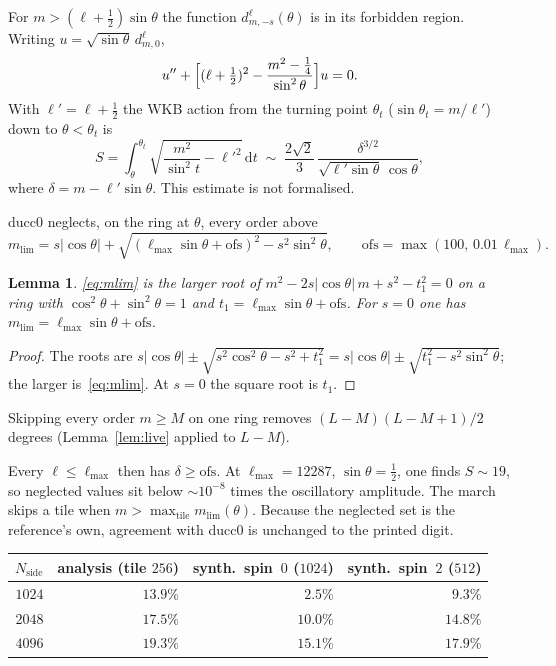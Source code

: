 \documentclass[11pt,a4paper]{article}
\newtheorem{lemma}[theorem]{Lemma}
\newcommand{\mlim}{m_{\mathrm{lim}}}
\newcommand{\ofs}{\mathrm{ofs}}
\numberwithin{equation}{section}
\begin{document}
For $m>(\ell+\tfrac12)\sin\theta$ the function $d^\ell_{m,-s}(\theta)$ is
in its forbidden region.  Writing $u=\sqrt{\sin\theta}\,d^\ell_{m,0}$,
\begin{equation}
\label{eq:legendre}
u''+\Bigl[(\ell+\tfrac12)^2-\frac{m^2-\tfrac14}{\sin^2\theta}\Bigr]u=0.
\end{equation}
With $\ell'=\ell+\tfrac12$ the WKB action from the turning point
$\theta_t$ ($\sin\theta_t=m/\ell'$) down to $\theta<\theta_t$ is
\begin{equation}
\label{eq:S}
S=\int_\theta^{\theta_t}
   \sqrt{\frac{m^2}{\sin^2 t}-{\ell'}^2}\,\mathrm{d}t
  \;\sim\;
  \frac{2\sqrt{2}}{3}\,
  \frac{\delta^{3/2}}{\sqrt{\ell'\sin\theta}\,\cos\theta},
\end{equation}
where $\delta=m-\ell'\sin\theta$.  This estimate is not formalised.

ducc0 neglects, on the ring at $\theta$, every order above
\begin{equation}
\label{eq:mlim}
\mlim
  =s\lvert\cos\theta\rvert
   +\sqrt{(\ell_{\max}\sin\theta+\ofs)^2-s^2\sin^2\theta},
\qquad
\ofs=\max(100,\,0.01\,\ell_{\max}).
\end{equation}

\begin{lemma}
\label{lem:mlim}
\eqref{eq:mlim} is the larger root of
$m^2-2s\lvert\cos\theta\rvert\, m+s^2-t_1^2=0$ on a ring with
$\cos^2\theta+\sin^2\theta=1$ and $t_1=\ell_{\max}\sin\theta+\ofs$.
For $s=0$ one has $\mlim=\ell_{\max}\sin\theta+\ofs$.
\end{lemma}

\begin{proof}
The roots are $s\lvert\cos\theta\rvert\pm\sqrt{s^2\cos^2\theta-s^2+t_1^2}
=s\lvert\cos\theta\rvert\pm\sqrt{t_1^2-s^2\sin^2\theta}$; the larger
is~\eqref{eq:mlim}.  At $s=0$ the square root is $t_1$.
\end{proof}

Skipping every order $m\ge M$ on one ring removes $(L-M)(L-M+1)/2$
degrees (Lemma~\ref{lem:live} applied to $L-M$).

Every $\ell\le\ell_{\max}$ then has $\delta\ge\ofs$.  At
$\ell_{\max}=12287$, $\sin\theta=\tfrac12$, one finds $S\sim 19$, so
neglected values sit below $\sim 10^{-8}$ times the oscillatory amplitude.
The march skips a tile when $m>\max_{\mathrm{tile}}\mlim(\theta)$.  Because
the neglected set is the reference's own, agreement with ducc0 is unchanged
to the printed digit.

\begin{center}
\small
\begin{tabular}{@{}rrrr@{}}
\toprule
$N_{\mathrm{side}}$ & analysis (tile $256$) & synth.\ spin~$0$ ($1024$) & synth.\ spin~$2$ ($512$) \\
\midrule
$1024$ & $13.9\%$ & $2.5\%$  & $9.3\%$  \\
$2048$ & $17.5\%$ & $10.0\%$ & $14.8\%$ \\
$4096$ & $19.3\%$ & $15.1\%$ & $17.9\%$ \\
\bottomrule
\end{tabular}
\end{center}
\end{document}
